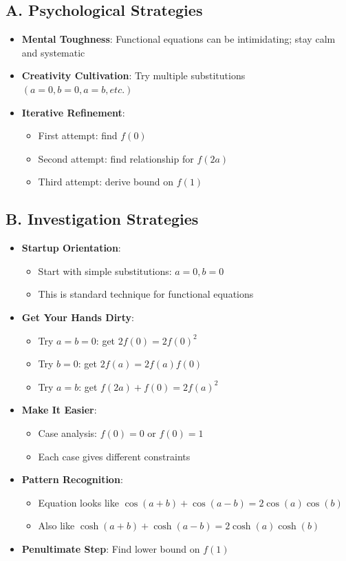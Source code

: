 \documentclass[12pt]{article}
\begin{document}
\begin{strategicbox}
\subsection*{A. Psychological Strategies}
\begin{itemize}[leftmargin=*]
    \item \textbf{Mental Toughness}: Functional equations can be intimidating; stay calm and systematic
    \item \textbf{Creativity Cultivation}: Try multiple substitutions $(a=0, b=0, a=b, etc.)$
    \item \textbf{Iterative Refinement}: 
    \begin{itemize}
        \item First attempt: find $f(0)$
        \item Second attempt: find relationship for $f(2a)$
        \item Third attempt: derive bound on $f(1)$
    \end{itemize}
\end{itemize}

\subsection*{B. Investigation Strategies}
\begin{itemize}[leftmargin=*]
    \item \textbf{Startup Orientation}: 
    \begin{itemize}
        \item Start with simple substitutions: $a = 0, b = 0$
        \item This is standard technique for functional equations
    \end{itemize}
    \item \textbf{Get Your Hands Dirty}: 
    \begin{itemize}
        \item Try $a = b = 0$: get $2f(0) = 2f(0)^2$
        \item Try $b = 0$: get $2f(a) = 2f(a)f(0)$
        \item Try $a = b$: get $f(2a) + f(0) = 2f(a)^2$
    \end{itemize}
    \item \textbf{Make It Easier}: 
    \begin{itemize}
        \item Case analysis: $f(0) = 0$ or $f(0) = 1$
        \item Each case gives different constraints
    \end{itemize}
    \item \textbf{Pattern Recognition}: 
    \begin{itemize}
        \item Equation looks like $\cos(a+b) + \cos(a-b) = 2\cos(a)\cos(b)$
        \item Also like $\cosh(a+b) + \cosh(a-b) = 2\cosh(a)\cosh(b)$
    \end{itemize}
    \item \textbf{Penultimate Step}: Find lower bound on $f(1)$
\end{itemize}


\end{strategicbox}
\end{document}
